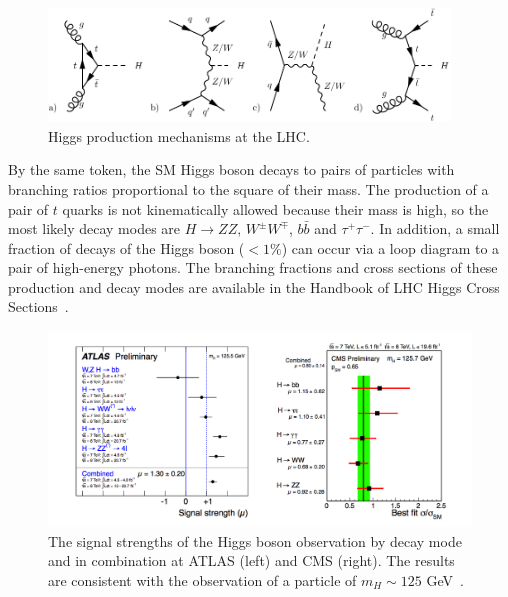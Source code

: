 \documentclass[10pt]{article}
\begin{document}
\begin{figure}[h!]


  \includegraphics[width=0.95\textwidth]{"test"}
  \caption{Higgs production mechanisms at the LHC.}
\end{figure}

By the same token, the SM Higgs boson decays to pairs of particles with branching ratios proportional to the square of their mass. The production of a pair of $t$ quarks is not kinematically allowed because their mass is high, so the most likely decay modes are $H \rightarrow ZZ \text{, } W^{\pm}W^{\mp}$, $ b\bar{b}$ and $ \tau^+ \tau^-$. In addition, a small fraction of decays of the Higgs boson ($<1\%$) can occur via a loop diagram to a pair of high-energy photons. The branching fractions and cross sections of these production and decay modes are available in the Handbook of LHC Higgs Cross Sections~\cite{H_XS1,H_XS2}.


\begin{figure}[h!]

  \centering
\includegraphics[width=\textwidth]{"SignalStrength"}
\caption{The signal strengths of the Higgs boson observation by decay mode and in combination at ATLAS (left) and CMS (right). The results are consistent with the observation of a particle of $m_H \sim 125$ GeV~\cite{H_XS3}.}
\end{figure}
\end{document}

